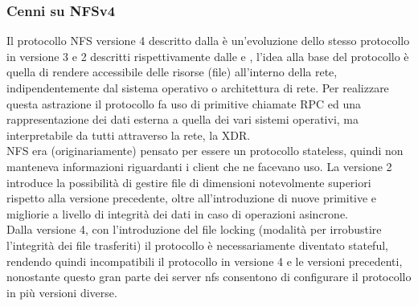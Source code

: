\documentclass[a4paper]{article}
\begin{document}
\subsubsection{Cenni su NFSv4}
Il protocollo \Gls{NFS} versione 4 descritto dalla \cite[rfc7530]{rfc7530} è un'evoluzione dello stesso protocollo in versione 3 e 2 descritti
rispettivamente dalle \cite[rfc1813]{rfc1813} e \cite[rfc1094]{rfc1094}, l'idea alla base del protocollo è quella di rendere accessibile delle
risorse (file) all'interno della rete, indipendentemente dal sistema operativo o architettura di rete. Per realizzare questa astrazione il protocollo
fa uso di primitive chiamate \Gls{RPC} ed una rappresentazione dei dati esterna a quella dei vari sistemi operativi, ma interpretabile da tutti attraverso
la rete, la \Gls{XDR}.\\
NFS era (originariamente) pensato per essere un protocollo stateless, quindi non manteneva informazioni riguardanti i client che ne facevano uso. La versione 2 introduce la possibilità
di gestire file di dimensioni notevolmente superiori rispetto alla versione precedente, oltre all'introduzione di nuove primitive e migliorie a livello di
integrità dei dati in caso di operazioni asincrone.\\
Dalla versione 4, con l'introduzione del file locking (modalità per irrobustire l'integrità dei file trasferiti) il protocollo è necessariamente diventato stateful, rendendo quindi
incompatibili il protocollo in versione 4 e le versioni precedenti, nonostante questo gran parte dei server nfs consentono di configurare il protocollo in più versioni diverse. 
\end{document}
